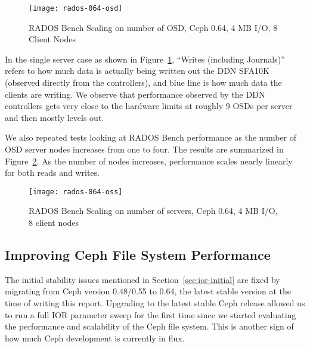 

\begin{figure}[htb]
\centering
\texttt{[image: rados-064-osd]}
\caption{RADOS Bench Scaling on number of OSD, Ceph 0.64, 4 MB I/O, 8 Client Nodes}
\label{fig:rados-064-osd}
\end{figure}

In the single server case as shown in Figure~\ref{fig:rados-064-osd}, ``Writes
(including Journals)'' refers to how much data is actually being written out
the DDN SFA10K (observed directly from the controllers), and blue line is how
much data the clients are writing.  We observe that performance observed by the
DDN controllers gets very close to the hardware limits at roughly 9 OSDs per
server and then mostly levels out.

We also repeated tests looking at RADOS Bench performance as the number of OSD
server nodes increases from one to four. The results are summarized in
Figure~\ref{fig:rados-064-oss}. As the number of nodes increases, performance
scales nearly linearly for both reads and writes.


\begin{figure}[htb]
\centering
\texttt{[image: rados-064-oss]}
\caption{RADOS Bench Scaling on number of servers, Ceph 0.64, 4 MB I/O, 8 client
nodes}
\label{fig:rados-064-oss}
\end{figure}



\subsection{Improving Ceph File System Performance}
\label{sec:ceph-tuning-fs}

The initial stability issues mentioned in Section~\ref{sec:ior-initial} are
fixed by migrating from Ceph version 0.48/0.55 to 0.64, the latest stable version at the
time of writing this report.  Upgrading to the latest stable Ceph release
allowed us to run a full IOR parameter sweep for the first time since we
started evaluating the performance and scalability of the Ceph file system.
This is another sign of how much Ceph development is currently in flux.

